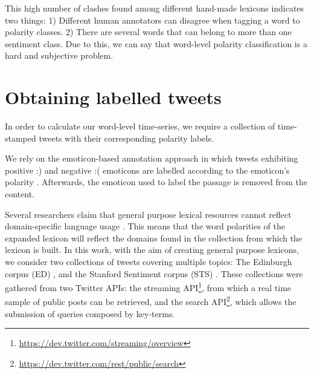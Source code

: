 \documentclass{sig-alternate}
\begin{document}
This high number of clashes found among different hand-made lexicons indicates two things: 1) Different human annotators can disagree when tagging a word to polarity classes. 2) There are several words that can belong to more than one sentiment class.  
Due to this, we can say that word-level polarity classification is a hard and subjective problem.  




\section{Obtaining labelled tweets}\label{sec:tweetlab}

In order to calculate our word-level time-series, we require a collection of time-stamped tweets with their corresponding polarity labels. 

We rely on the emoticon-based annotation approach in which tweets exhibiting positive :) and negative :( emoticons are labelled according to the emoticon's polarity \cite{go2010}. Afterwards, the emoticon used to label the passage is removed from the content.



Several researchers claim that general purpose lexical resources cannot reflect domain-specific language usage \cite{Choi2009, Zhou2014}. This means that the word polarities of the expanded lexicon will reflect the domains found in the collection from which the lexicon is built.  In this work, with the aim of creating general purpose lexicons, we consider two  collections of tweets covering multiple topics: The Edinburgh corpus (ED) \cite{Petrovic2010}, and the Stanford Sentiment corpus (STS) \cite{go2010}. These collections were gathered from  two Twitter APIs: the streaming API\footnote{\url{https://dev.twitter.com/streaming/overview}}, from which a real time sample of public posts can be retrieved, and the search API\footnote{\url{https://dev.twitter.com/rest/public/search}}, which allows the submission of queries composed by key-terms.
\end{document}
